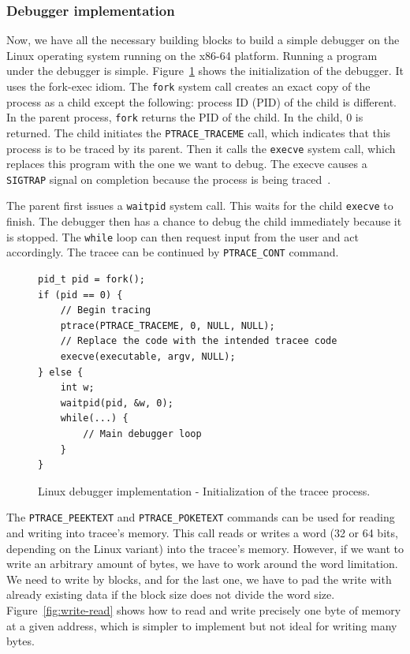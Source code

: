 \subsubsection{Debugger implementation}
Now, we have all the necessary building blocks to build a simple debugger on
the Linux operating system running on the x86-64 platform. Running a program
under the debugger is simple. Figure~\ref{fig:debugger-init} shows the
initialization of the debugger. It uses the fork-exec idiom. The \texttt{fork}
system call creates an exact copy of the process as a child except the
following: process ID (PID) of the child is different. In the parent process,
\texttt{fork} returns the PID of the child. In the child, $0$ is returned. The
child initiates the \texttt{PTRACE\_TRACEME} call, which indicates that this
process is to be traced by its parent. Then it calls the \texttt{execve} system
call, which replaces this program with the one we want to debug. The execve
causes a \texttt{SIGTRAP} signal on completion because the process is being
traced~\cite{execve}.

The parent first issues a \texttt{waitpid} system call. This waits for the
child \texttt{execve} to finish. The debugger then has a chance to debug the
child immediately because it is stopped. The \texttt{while} loop can then
request input from the user and act accordingly. The tracee can be continued by
\texttt{PTRACE\_CONT} command.

\begin{figure}
    \begin{verbatim}
pid_t pid = fork();
if (pid == 0) {
    // Begin tracing
    ptrace(PTRACE_TRACEME, 0, NULL, NULL);
    // Replace the code with the intended tracee code
    execve(executable, argv, NULL);
} else {
    int w;
    waitpid(pid, &w, 0);
    while(...) {
        // Main debugger loop
    }
}
    \end{verbatim}
    \caption{Linux debugger implementation - Initialization of the tracee
    process.}
    \label{fig:debugger-init}
\end{figure}

The \texttt{PTRACE\_PEEKTEXT} and \texttt{PTRACE\_POKETEXT} commands can be
used for reading and writing into tracee's memory. This call reads or writes
a word (32 or 64 bits, depending on the Linux variant) into the tracee's
memory. However, if we want to write an arbitrary amount of bytes, we have to
work around the word limitation. We need to write by blocks, and for the last
one, we have to pad the write with already existing data if the block size does
not divide the word size. Figure~\ref{fig:write-read} shows how to read and
write precisely one byte of memory at a given address, which is simpler to
implement but not ideal for writing many bytes.

